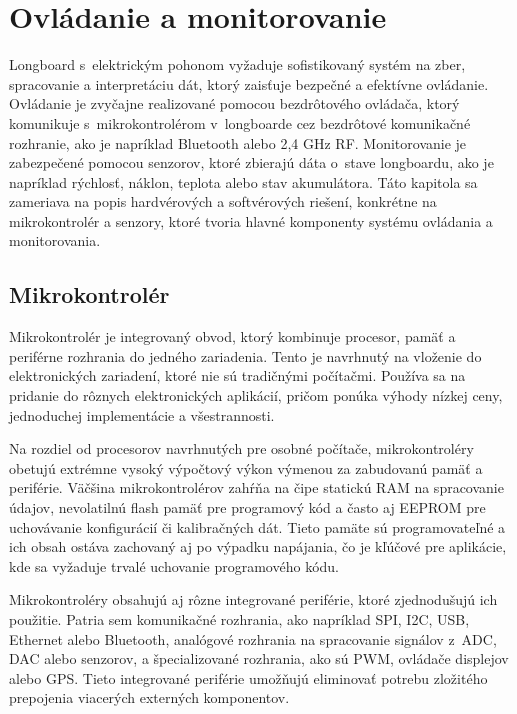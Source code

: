 \section{Ovládanie a monitorovanie}
Longboard s~elektrickým pohonom vyžaduje sofistikovaný systém na zber, spracovanie a interpretáciu dát, ktorý zaisťuje bezpečné a efektívne ovládanie. 
Ovládanie je zvyčajne realizované pomocou bezdrôtového ovládača, ktorý komunikuje s~mikrokontrolérom v~longboarde cez bezdrôtové komunikačné rozhranie, ako je napríklad Bluetooth alebo 2,4 GHz RF.
Monitorovanie je zabezpečené pomocou senzorov, ktoré zbierajú dáta o~stave longboardu, ako je napríklad rýchlosť, náklon, teplota alebo stav akumulátora.
Táto kapitola sa zameriava na popis hardvérových a softvérových riešení, konkrétne na mikrokontrolér a senzory, ktoré tvoria hlavné komponenty systému ovládania a monitorovania.

\subsection{Mikrokontrolér}
Mikrokontrolér je integrovaný obvod, ktorý kombinuje procesor, pamäť a periférne rozhrania do jedného zariadenia. 
Tento  je navrhnutý na vloženie do elektronických zariadení, ktoré nie sú tradičnými počítačmi. 
Používa sa na pridanie  do rôznych elektronických aplikácií, pričom ponúka výhody nízkej ceny, jednoduchej implementácie a všestrannosti.

Na rozdiel od procesorov navrhnutých pre osobné počítače, mikrokontroléry obetujú extrémne vysoký výpočtový výkon výmenou za zabudovanú pamäť a periférie. 
Väčšina mikrokontrolérov zahŕňa na čipe statickú RAM na spracovanie údajov, nevolatilnú flash pamäť pre programový kód a často aj EEPROM pre uchovávanie konfigurácií či kalibračných dát. 
Tieto pamäte sú programovateľné a ich obsah ostáva zachovaný aj po výpadku napájania, čo je kľúčové pre aplikácie, kde sa vyžaduje trvalé uchovanie programového kódu.

Mikrokontroléry obsahujú aj rôzne integrované periférie, ktoré zjednodušujú ich použitie. 
Patria sem komunikačné rozhrania, ako napríklad SPI, I2C, USB, Ethernet alebo Bluetooth, analógové rozhrania na spracovanie signálov z~ADC, DAC alebo senzorov, a špecializované rozhrania, ako sú PWM, ovládače displejov alebo GPS. 
Tieto integrované periférie umožňujú eliminovať potrebu zložitého prepojenia viacerých externých komponentov.

